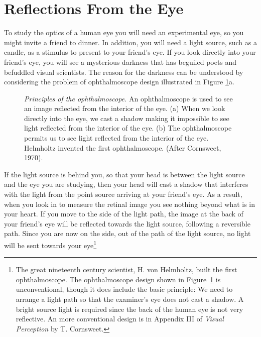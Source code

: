 \section{Reflections From the Eye}
To study the optics of a human eye
you will need an experimental eye, so
you might invite a friend to dinner.
In addition, you will
need a light source, such as a candle,
as a stimulus to present to your friend's eye.
If you look directly into your friend's
eye, you will see a mysterious darkness that has beguiled
poets and befuddled visual scientists.
The reason for the darkness can be understood
by considering the problem of ophthalmoscope design
illustrated in Figure \ref{f1:ophthalmoscope}a.
\begin{figure}
\centerline {
}
\caption[Ophtalmoscope Principles]{
{\em Principles of the ophthalmoscope.}
An ophthalmoscope is used to see an image reflected
from the interior of the eye.
(a) When we look directly into the eye,
we cast a shadow making it impossible to see
light reflected from the interior of the eye.
(b) The ophthalmoscope permits us to
see light reflected from the interior of the eye.
Helmholtz invented the first ophthalmoscope.
(After Cornsweet, 1970).
}
\label{f1:ophthalmoscope}
\end{figure}

If the light source is behind you, so that your
head is between the light source and the eye you are studying,
then your head will cast
a shadow that interferes with the light from the point source
arriving at your friend's eye.
As a result, when you look in to measure the 
retinal image you see nothing beyond what is in your heart.
If you move to the side of the light path,
the image at the back of your friend's eye will be reflected
towards the light source, following a reversible path.
Since you are now on the side, out of the path of the light source, 
no light will be sent towards your eye\footnote{
The great nineteenth century scientist, H. von Helmholtz,
built the first ophthalmoscope.
The ophthalmoscope design shown in Figure~\ref{f1:ophthalmoscope}
is unconventional, though it does include the basic principle:
We need to arrange a light path
so that the examiner's eye does not cast a shadow.
A bright source light is required since
the back of the human eye is not very reflective.
An more conventional
design is in Appendix III of {\em Visual Perception} by T. Cornsweet.
}

